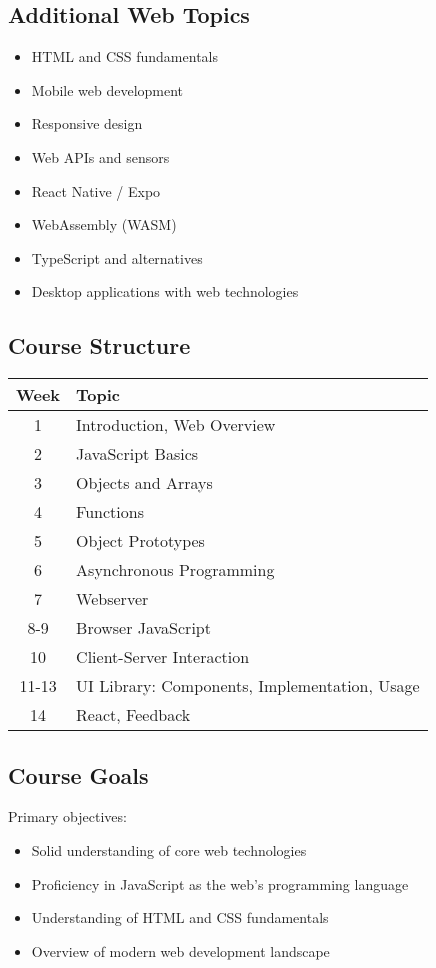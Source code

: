 \subsection{Additional Web Topics}
\begin{itemize}
    \item HTML and CSS fundamentals
    \item Mobile web development
    \item Responsive design
    \item Web APIs and sensors
    \item React Native / Expo
    \item WebAssembly (WASM)
    \item TypeScript and alternatives
    \item Desktop applications with web technologies
\end{itemize}

\subsection{Course Structure}
\begin{center}
\begin{tabular}{|c|l|}
\hline
Week & Topic \\
\hline
1 & Introduction, Web Overview \\
2 & JavaScript Basics \\
3 & Objects and Arrays \\
4 & Functions \\
5 & Object Prototypes \\
6 & Asynchronous Programming \\
7 & Webserver \\
8-9 & Browser JavaScript \\
10 & Client-Server Interaction \\
11-13 & UI Library: Components, Implementation, Usage \\
14 & React, Feedback \\
\hline
\end{tabular}
\end{center}

\subsection{Course Goals}
Primary objectives:
\begin{itemize}
    \item Solid understanding of core web technologies
    \item Proficiency in JavaScript as the web's programming language
    \item Understanding of HTML and CSS fundamentals
    \item Overview of modern web development landscape
\end{itemize}

